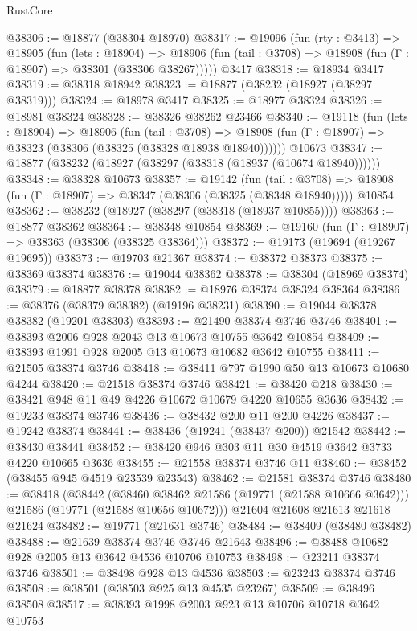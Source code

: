 \begin{lexlean}{RustCore}
\begin{coremodule}
@38306 := @18877 (@38304 @18970)
@38317 := @19096
    (fun (rty : @3413) =>
    @18905
      (fun (lets : @18904) =>
      @18906 (fun (tail : @3708) => @18908 (fun (Γ : @18907) => @38301 (@38306 @38267)))))
    @3417
@38318 := @18934 @3417
@38319 := @38318 @18942
@38323 := @18877 (@38232 (@18927 (@38297 @38319)))
@38324 := @18978 @3417
@38325 := @18977 @38324
@38326 := @18981 @38324
@38328 := @38326 @38262 @23466
@38340 := @19118
    (fun (lets : @18904) =>
    @18906
      (fun (tail : @3708) =>
      @18908 (fun (Γ : @18907) => @38323 (@38306 (@38325 (@38328 @18938 @18940))))))
    @10673
@38347 := @18877 (@38232 (@18927 (@38297 (@38318 (@18937 (@10674 @18940))))))
@38348 := @38328 @10673
@38357 := @19142
    (fun (tail : @3708) => @18908 (fun (Γ : @18907) => @38347 (@38306 (@38325 (@38348 @18940)))))
    @10854
@38362 := @38232 (@18927 (@38297 (@38318 (@18937 @10855))))
@38363 := @18877 @38362
@38364 := @38348 @10854
@38369 := @19160 (fun (Γ : @18907) => @38363 (@38306 (@38325 @38364)))
@38372 := @19173 (@19694 (@19267 @19695))
@38373 := @19703 @21367
@38374 := @38372 @38373
@38375 := @38369 @38374
@38376 := @19044 @38362
@38378 := @38304 (@18969 @38374)
@38379 := @18877 @38378
@38382 := @18976 @38374 @38324 @38364
@38386 := @38376 (@38379 @38382) (@19196 @38231)
@38390 := @19044 @38378 @38382 (@19201 @38303)
@38393 := @21490 @38374 @3746 @3746
@38401 := @38393 @2006 @928 @2043 @13 @10673 @10755 @3642 @10854
@38409 := @38393 @1991 @928 @2005 @13 @10673 @10682 @3642 @10755
@38411 := @21505 @38374 @3746
@38418 := @38411 @797 @1990 @50 @13 @10673 @10680 @4244
@38420 := @21518 @38374 @3746
@38421 := @38420 @218
@38430 := @38421 @948 @11 @49 @4226 @10672 @10679 @4220 @10655 @3636
@38432 := @19233 @38374 @3746
@38436 := @38432 @200 @11 @200 @4226
@38437 := @19242 @38374
@38441 := @38436 (@19241 (@38437 @200)) @21542
@38442 := @38430 @38441
@38452 := @38420 @946 @303 @11 @30 @4519 @3642 @3733 @4220 @10665 @3636
@38455 := @21558 @38374 @3746 @11
@38460 := @38452 (@38455 @945 @4519 @23539 @23543)
@38462 := @21581 @38374 @3746
@38480 := @38418
    (@38442
      (@38460 @38462 @21586 (@19771 (@21588 @10666 @3642)))
      @21586
      (@19771 (@21588 @10656 @10672)))
    @21604
    @21608
    @21613
    @21618
    @21624
@38482 := @19771 (@21631 @3746)
@38484 := @38409 (@38480 @38482)
@38488 := @21639 @38374 @3746 @3746 @21643
@38496 := @38488 @10682 @928 @2005 @13 @3642 @4536 @10706 @10753
@38498 := @23211 @38374 @3746
@38501 := @38498 @928 @13 @4536
@38503 := @23243 @38374 @3746
@38508 := @38501 (@38503 @925 @13 @4535 @23267)
@38509 := @38496 @38508
@38517 := @38393 @1998 @2003 @923 @13 @10706 @10718 @3642 @10753

\end{coremodule}
\end{lexlean}
